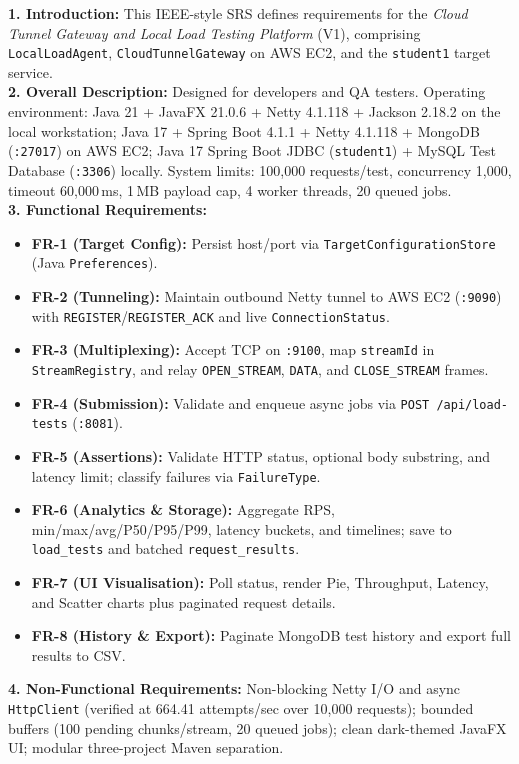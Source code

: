 \documentclass[11pt,a4paper]{report}
\begin{document}
\textbf{1. Introduction:} This IEEE-style SRS defines requirements for the \textit{Cloud Tunnel Gateway and Local Load Testing Platform} (V1), comprising \texttt{LocalLoadAgent}, \texttt{CloudTunnelGateway} on AWS EC2, and the \texttt{student1} target service.\\
\textbf{2. Overall Description:} Designed for developers and QA testers. Operating environment: Java 21 + JavaFX 21.0.6 + Netty 4.1.118 + Jackson 2.18.2 on the local workstation; Java 17 + Spring Boot 4.1.1 + Netty 4.1.118 + MongoDB (\texttt{:27017}) on AWS EC2; Java 17 Spring Boot JDBC (\texttt{student1}) + MySQL Test Database (\texttt{:3306}) locally. System limits: 100,000 requests/test, concurrency 1,000, timeout 60,000\,ms, 1\,MB payload cap, 4 worker threads, 20 queued jobs.\\
\textbf{3. Functional Requirements:}
\begin{itemize}
  \item \textbf{FR-1 (Target Config):} Persist host/port via \texttt{TargetConfigurationStore} (Java \texttt{Preferences}).
  \item \textbf{FR-2 (Tunneling):} Maintain outbound Netty tunnel to AWS EC2 (\texttt{:9090}) with \texttt{REGISTER}/\texttt{REGISTER\_ACK} and live \texttt{ConnectionStatus}.
  \item \textbf{FR-3 (Multiplexing):} Accept TCP on \texttt{:9100}, map \texttt{streamId} in \texttt{StreamRegistry}, and relay \texttt{OPEN\_STREAM}, \texttt{DATA}, and \texttt{CLOSE\_STREAM} frames.
  \item \textbf{FR-4 (Submission):} Validate and enqueue async jobs via \texttt{POST /api/load-tests} (\texttt{:8081}).
  \item \textbf{FR-5 (Assertions):} Validate HTTP status, optional body substring, and latency limit; classify failures via \texttt{FailureType}.
  \item \textbf{FR-6 (Analytics \& Storage):} Aggregate RPS, min/max/avg/P50/P95/P99, latency buckets, and timelines; save to \texttt{load\_tests} and batched \texttt{request\_results}.
  \item \textbf{FR-7 (UI Visualisation):} Poll status, render Pie, Throughput, Latency, and Scatter charts plus paginated request details.
  \item \textbf{FR-8 (History \& Export):} Paginate MongoDB test history and export full results to CSV.
\end{itemize}
\textbf{4. Non-Functional Requirements:} Non-blocking Netty I/O and async \texttt{HttpClient} (verified at 664.41 attempts/sec over 10,000 requests); bounded buffers (100 pending chunks/stream, 20 queued jobs); clean dark-themed JavaFX UI; modular three-project Maven separation.
\end{document}
